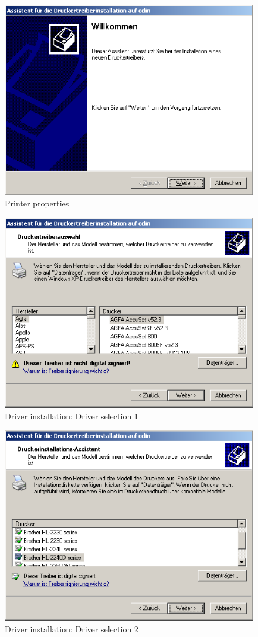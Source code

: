 \begin{figure}[hbt!]
\centering
\includegraphics[width=\columnwidth]{image010}
\caption{Printer properties}
\label{fig:sambalpd:setup-start}
\end{figure}

\begin{figure}[hbt!]
\centering
\includegraphics[width=0.7\columnwidth]{image011}
\caption{Driver installation: Driver selection 1}
\label{fig:sambalpd:setup-choose-driver:1}
\end{figure}

\begin{figure}[hbt!]
\centering
\includegraphics[width=0.7\columnwidth]{image012}
\caption{Driver installation: Driver selection 2}
\label{fig:sambalpd:setup-choose-driver:2}
\end{figure}

